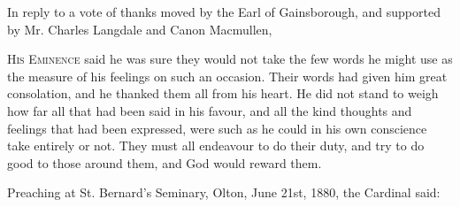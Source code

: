 In
reply to a vote of thanks moved by the Earl of Gainsborough, and
supported by Mr. Charles Langdale and Canon Macmullen,

H\textsc{is}
E\textsc{minence} said he was sure they would not take
the few words he might use as the measure of his feelings on such an
occasion. Their words had given him great consolation, and he thanked
them all from his heart. He did not stand to weigh how far all that
had been said in his favour, and all the kind thoughts and feelings
that had been expressed, were such as he could in his own conscience
take entirely or not. They must all endeavour to do their duty, and
try to do good to those around them, and God would reward them.


Preaching
at St. Bernard's Seminary, Olton, June 21st, 1880, the Cardinal said:

